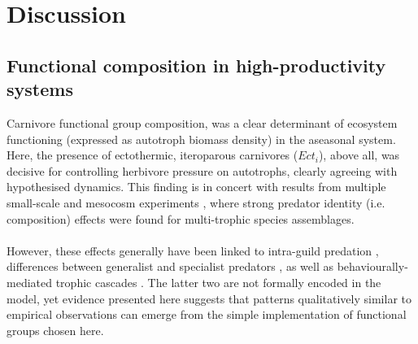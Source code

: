 \chapter{Discussion}
\label{chap:dis}
%
\section{Functional composition in high-productivity systems}
Carnivore functional group composition, was a clear determinant of ecosystem functioning (expressed as autotroph biomass density) in the aseasonal system. 
Here, the presence of ectothermic, iteroparous carnivores ($Ect_i$), above all, was decisive for controlling herbivore pressure on autotrophs, clearly agreeing with hypothesised dynamics. 
This finding is in concert with results from multiple small-scale and mesocosm experiments \citep[e.g.][]{Finke2005, OConnor2008, Sanders2011}, where strong predator identity (i.e. composition) effects were found for multi-trophic species assemblages.\\\\
However, these effects generally have been  linked to intra-guild predation \citep{Ives2005}, differences between  generalist and specialist predators \citep{Duffy2007, Sanders2011}, as well as behaviourally-mediated trophic cascades \citep{Beschta2009, Schmitz2015}. 
The latter two are not formally encoded in the model, yet evidence presented here suggests that patterns qualitatively similar to empirical observations can emerge from the simple implementation of functional groups chosen here. 
